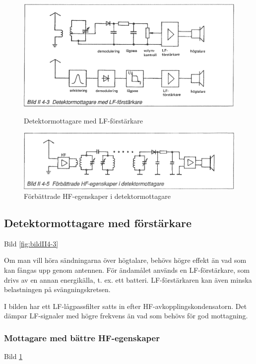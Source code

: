 \begin{figure}
  \includegraphics[width=\textwidth]{images/bild_2_4-03}
  \caption{Detektormottagare med LF-förstärkare}
  \label{fig:bildII4-3}

  \includegraphics[width=\textwidth]{images/bild_2_4-05}
  \caption{Förbättrade HF-egenskaper i detektormottagare}
  \label{fig:bildII4-5}
\end{figure}

\subsection{Detektormottagare med förstärkare}

Bild \ref{fig:bildII4-3}

Om man vill höra sändningarna över högtalare, behövs högre effekt än
vad som kan fångas upp genom antennen. För ändamålet används en
LF-förstärkare, som drivs av en annan energikälla, t. ex. ett
batteri. LF-förstärkaren kan även minska belastningen på
svängningskretsen.

I bilden har ett LF-lågpassfilter satts in efter
HF-avkopplingskondensatorn. Det dämpar LF-signaler med högre frekvens
än vad som behövs för god mottagning.

\subsubsection{Mottagare med bättre HF-egenskaper}

Bild \ref{fig:bildII4-5}

